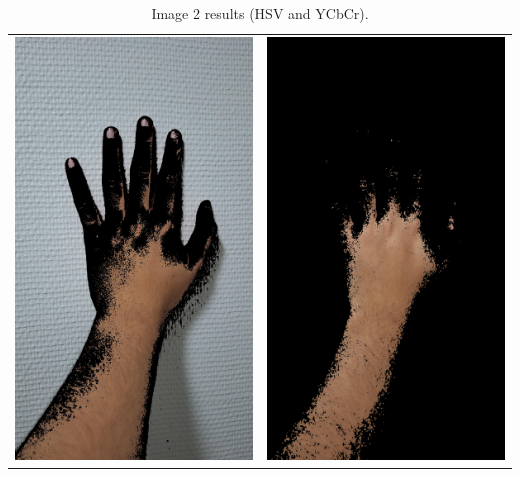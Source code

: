 \documentclass[journal]{IEEEtran}
\begin{document}
\begin{table}[!htbp]
\centering
\begin{tabular}{cc}
    \includegraphics[width=0.3\linewidth]{../images/results/hand2_skin_hsv.jpg} & \includegraphics[width=0.3\linewidth]{../images/results/hand2_skin_ycc.jpg} \\
\end{tabular}
\caption{Image 2 results (HSV and YCbCr).}
\label{tab:images2}
\end{table}
\end{document}
